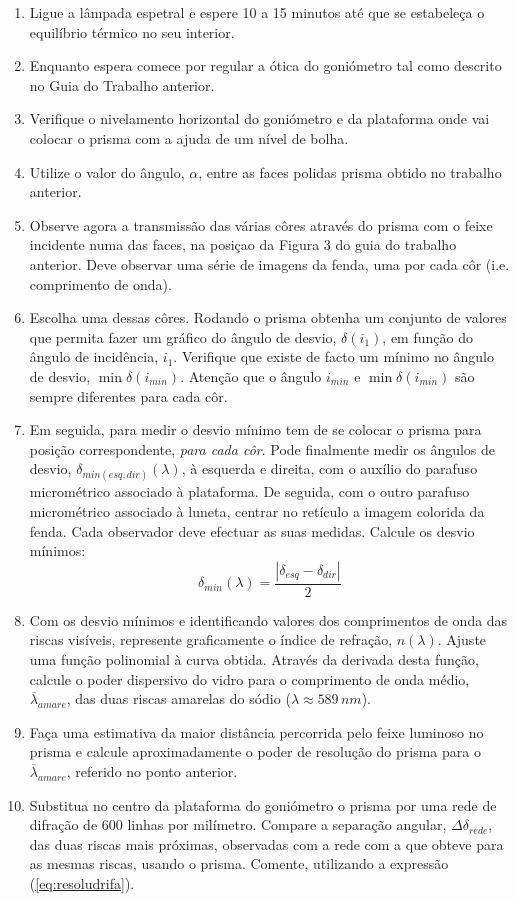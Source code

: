 \documentclass[a4paper,12pt]{article}  %
\begin{document}
\begin{enumerate}
\item Ligue  a  lâmpada  espetral  e  espere  10  a  15  minutos    até  que  se  estabeleça  o 
equilíbrio térmico no seu interior. 
\item Enquanto espera comece por regular a ótica  do goniómetro tal como descrito no Guia do Trabalho anterior.
\item Verifique o nivelamento horizontal do goniómetro e da plataforma onde vai colocar o prisma com a ajuda de um nível de bolha. 
\item Utilize o valor do ângulo, $\alpha$, entre as faces polidas prisma obtido no trabalho anterior.
\item  Observe agora  a  transmissão  das várias côres  através  do  prisma  com  o  feixe  incidente  numa  das  faces, na posiçao da Figura 3 do guia do trabalho anterior.  Deve  observar   uma  série  de 
imagens da fenda, uma por cada côr (i.e. comprimento de onda).
\item Escolha uma dessas côres. Rodando o prisma obtenha um conjunto de valores que permita fazer um gráfico do ângulo de desvio, $\delta(i_1)$, 
em função do ângulo de incidência, $i_1$. Verifique que existe de facto um mínimo no ângulo de desvio,  $\min \delta(i_{min})$. Atenção que o ângulo $i_{min}$ e $\min \delta(i_{min})$ são sempre diferentes para cada côr.
\item  Em seguida, para medir o desvio mínimo tem  de se colocar o prisma para posição correspondente,  \emph{para cada côr}. Pode finalmente medir os ângulos de desvio, $\delta_{min(esq, dir)}(\lambda)$, à esquerda e direita, com  o auxílio  do  parafuso  micrométrico  associado  à  plataforma.  
De seguida,  com  o outro parafuso micrométrico associado à luneta, centrar no retículo a imagem colorida da fenda. Cada observador deve efectuar as suas medidas. Calcule os desvio mínimos:
$$\delta_{min}(\lambda) = \frac{|\delta_{esq} -  \delta_{dir}|}{2}$$ 
\item Com os desvio mínimos e identificando  valores  dos  comprimentos  de onda  das riscas visíveis, represente  graficamente  o 
índice de refração, $n(\lambda)$. Ajuste uma função polinomial à curva obtida. Através da  derivada desta função, calcule o poder dispersivo do vidro para o comprimento de onda médio, $\overline{\lambda}_{amare}$, das 
duas riscas amarelas do sódio ($\lambda \approx 589\,nm$). 
\item Faça uma estimativa da maior distância percorrida pelo feixe luminoso no prisma e calcule 
aproximadamente  o  poder  de  resolução  do  prisma  para  o  $\overline{\lambda}_{amare}$, referido  no  ponto  anterior. 
\item Substitua no centro da plataforma do goniómetro o prisma por uma rede de difração de 
600 linhas por milímetro. Compare a separação angular, $\Delta \delta_{rede}$, das duas riscas mais próximas, 
observadas  com  a  rede  com  a  que  obteve  para  as  mesmas  riscas,  usando  o  prisma. 
Comente, utilizando a expressão (\ref{eq:resoludrifa}). 

\end{enumerate}
\end{document}
